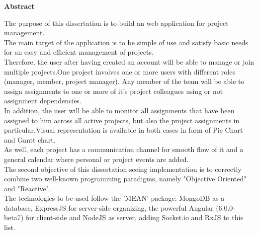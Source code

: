 \thispagestyle{plain}
\begin{center}
    \vspace{0.9cm}
    \huge
    \textbf{Abstract}
\end{center}
\quad The purpose of this dissertation is to build an web application for project management.\\
\null\quad The main target of the application is to be simple of use and satisfy basic
needs for an easy and efficient management of projects.\\
\null\quad Therefore, the user after having created an account will be able to manage
or join multiple projects.One project involves one or more
users with different roles (manager, member, project manager). Any member of the team will be able to assign assignments to one or more of it's project colleagues using or not assignment dependencies.\\
\null\quad In addition, the user will be able to monitor all assignments that have been assigned to him across all active projects, but also the project assignments in particular.Visual representation is available in both cases in form of Pie Chart and Gantt chart.\\
\null\quad As well, each project has a communication channel for smooth flow of it and a general calendar where personal or project events are added.\\
\null\quad The second objective of this dissertation seeing implementation is to correctly combine two well-known programming paradigms, namely "Objective Oriented" and "Reactive".\\
\null\quad The technologies to be used follow the 'MEAN' package: MongoDB as a database, ExpressJS for server-side organizing, the powerful Angular (6.0.0-beta7) for client-side and NodeJS as server, adding Socket.io and RxJS to this list.
